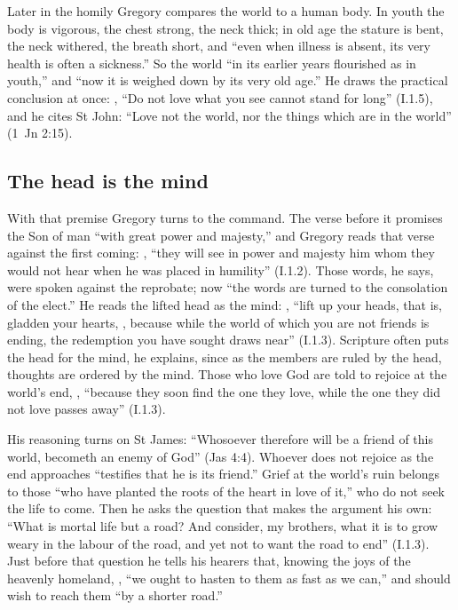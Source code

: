 Later in the homily Gregory compares the world to a human body. In youth the
body is vigorous, the chest strong, the neck thick; in old age the stature is
bent, the neck withered, the breath short, and ``even when illness is absent,
its very health is often a sickness.'' So the world ``in its earlier years
flourished as in youth,'' and ``now it is weighed down by its very old age.''
He draws the practical conclusion at once: , ``Do not love what you see cannot stand
for long'' (I.1.5), and he cites St John: ``Love not the world, nor the things
which are in the world'' (1~Jn 2:15).

\subsection{The head is the mind}

With that premise Gregory turns to the command. The verse before it promises
the Son of man ``with great power and majesty,'' and Gregory reads that verse
against the first coming: , ``they will see in power and majesty him
whom they would not hear when he was placed in humility'' (I.1.2). Those
words, he says, were spoken against the reprobate; now ``the words are turned
to the consolation of the elect.'' He reads the lifted head as the mind:
, ``lift up your heads, that is,
gladden your hearts, , because while the world of which you are not
friends is ending, the redemption you have sought draws near'' (I.1.3).
Scripture often puts the head for the mind, he explains, since as the members
are ruled by the head, thoughts are ordered by the mind. Those who love God are
told to rejoice at the world's end, , ``because they soon find the
one they love, while the one they did not love passes away'' (I.1.3).

His reasoning turns on St James: ``Whosoever therefore will be a friend of
this world, becometh an enemy of God'' (Jas 4:4). Whoever does not rejoice as
the end approaches ``testifies that he is its friend.'' Grief at the world's
ruin belongs to those ``who have planted the roots of the heart in love of
it,'' who do not seek the life to come. Then he asks the question that makes
the argument his own:  ``What is
mortal life but a road? And consider, my brothers, what it is to grow weary
in the labour of the road, and yet not to want the road to end'' (I.1.3).
Just before that question he tells his hearers that, knowing the joys of the
heavenly homeland, , ``we ought to
hasten to them as fast as we can,'' and should wish to reach them ``by a
shorter road.''

